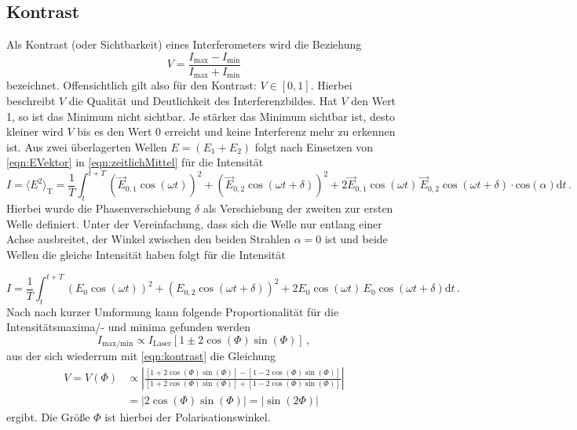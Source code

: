 \subsection{Kontrast} \label{sec:kontrast}
Als Kontrast (oder Sichtbarkeit) eines Interferometers wird die Beziehung
\begin{equation} \label{eqn:kontrast}
    V = \frac{I_\text{max} - I_\text{min}}{I_\text{max} + I_\text{min}}
\end{equation}
bezeichnet. Offensichtlich gilt also für den Kontrast: $V \in [0,1]$.
Hierbei beschreibt $V$ die Qualität und Deutlichkeit des Interferenzbildes. Hat $V$ den Wert 1, so ist das Minimum nicht sichtbar. Je stärker das Minimum sichtbar ist, desto kleiner wird $V$ bis es den Wert 0 erreicht und keine Interferenz mehr zu erkennen ist.
Aus zwei überlagerten Wellen $E=(E_1+E_2)$ folgt nach Einsetzen von \autoref{eqn:EVektor} in \autoref{eqn:zeitlichMittel} für die Intensität
\begin{equation*}
    I = \langle E^2\rangle _{\text{T}}= \frac{1}{T}\int_t^{t+T}  (\vec{E}_{0,1}\cos{(\omega t)})^2+(\vec{E}_{0,2}\cos{(\omega t+ \delta)})^2+2\vec{E}_{0,1}\cos{(\omega t)}\, \vec{E}_{0,2}\cos{(\omega t+ \delta)}\cdot\text{cos}(\alpha)\text{d}t\, .
\end{equation*}
Hierbei wurde die Phasenverschiebung $\delta$ als Verschiebung der zweiten zur ersten Welle definiert. Unter der Vereinfachung, dass sich die Welle nur entlang einer Achse ausbreitet, der Winkel zwischen den beiden Strahlen $\alpha=0$ ist und beide Wellen die gleiche Intensität haben folgt für die Intensität

\begin{equation*}
    I=\frac{1}{T}\int_t^{t+T} (E_{0}\cos{(\omega t)})^2+(E_{0,2}\cos{(\omega t+ \delta)})^2+2E_{0}\cos{(\omega t)}\, E_{0}\cos{(\omega t+ \delta)}\text{d}t\, .
\end{equation*}
Nach nach kurzer Umformung kann 
folgende Proportionalität für die Intensitätsmaxima/- und minima gefunden werden
\begin{equation*}
    I_\text{max/min} \propto I_\text{Laser} \left[ 1 \pm 2 \cos(\Phi) \sin (\Phi) \right] \, ,
\end{equation*}
aus der sich wiederrum mit \autoref{eqn:kontrast} die Gleichung
\begin{align}\label{eqn:kontrast2}
    V = V(\Phi) &\propto \left|\frac{\left[ 1 + 2 \cos(\Phi) \sin (\Phi) \right] - \left[ 1 - 2 \cos(\Phi) \sin (\Phi) \right]}{\left[ 1 + 2 \cos(\Phi) \sin (\Phi) \right] + \left[ 1 - 2 \cos(\Phi) \sin (\Phi) \right]}\right| \\
    &= \left|2 \cos(\Phi) \sin(\Phi) \right| = \left| \sin (2 \Phi) \right|
\end{align}
ergibt. %
Die Größe $\Phi$ ist hierbei der Polarisationswinkel. 
